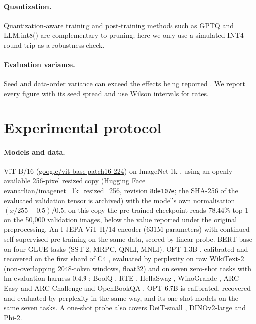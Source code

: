 \documentclass[11pt,a4paper]{article}
\begin{document}
\paragraph{Quantization.} Quantization-aware training \cite{jacob2018quantization} and post-training methods such as GPTQ \cite{frantar2023gptq} and LLM.int8() \cite{dettmers2022llmint8} are complementary to pruning; here we only use a simulated INT4 round trip as a robustness check.

\paragraph{Evaluation variance.} Seed and data-order variance can exceed the effects being reported \cite{dodge2020finetuning,bouthillier2021variance,henderson2018matters}. We report every figure with its seed spread and use Wilson intervals \cite{wilson1927probable} for rates.

\section{Experimental protocol}
\label{sec:protocol}

\paragraph{Models and data.} ViT-B/16 \cite{dosovitskiy2021vit} (\url{google/vit-base-patch16-224}) on ImageNet-1k \cite{russakovsky2015imagenet}, using an openly available 256-pixel resized copy (Hugging Face \url{evanarlian/imagenet_1k_resized_256}, revision \texttt{8de107e}; the SHA-256 of the evaluated validation tensor is archived) with the model's own normalisation $(x/255-0.5)/0.5$; on this copy the pre-trained checkpoint reads 78.44\% top-1 on the 50{,}000 validation images, below the value reported under the original preprocessing. An I-JEPA ViT-H/14 encoder (631M parameters) \cite{assran2023ijepa} with continued self-supervised pre-training on the same data, scored by linear probe. BERT-base \cite{devlin2019bert} on four GLUE tasks \cite{wang2019glue} (SST-2, MRPC, QNLI, MNLI). OPT-1.3B \cite{zhang2022opt}, calibrated and recovered on the first shard of C4 \cite{raffel2020t5}, evaluated by perplexity on raw WikiText-2 \cite{merity2017wikitext} (non-overlapping 2048-token windows, float32) and on seven zero-shot tasks with lm-evaluation-harness 0.4.9 \cite{gao2024lmeval}: BoolQ \cite{clark2019boolq}, RTE \cite{wang2019glue}, HellaSwag \cite{zellers2019hellaswag}, WinoGrande \cite{sakaguchi2020winogrande}, ARC-Easy and ARC-Challenge \cite{clark2018arc} and OpenBookQA \cite{mihaylov2018openbookqa}. OPT-6.7B is calibrated, recovered and evaluated by perplexity in the same way, and its one-shot models on the same seven tasks. A one-shot probe also covers DeiT-small \cite{touvron2021deit}, DINOv2-large \cite{oquab2023dinov2} and Phi-2.
\end{document}
